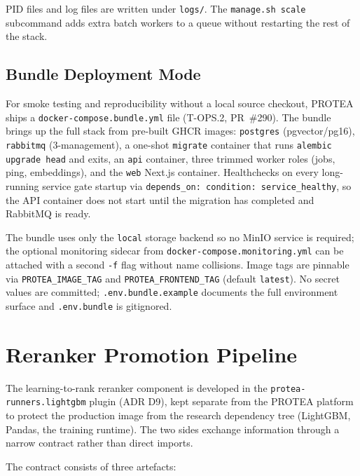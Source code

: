PID files and log files are written under \texttt{logs/}. The
\texttt{manage.sh scale} subcommand adds extra batch workers to a queue without
restarting the rest of the stack.

\subsection{Bundle Deployment Mode}
\label{subsec:bundle-deployment}

For smoke testing and reproducibility without a local source checkout, PROTEA
ships a \texttt{docker-compose.bundle.yml} file (T-OPS.2, PR~\#290). The
bundle brings up the full stack from pre-built GHCR images:
\texttt{postgres} (pgvector/pg16), \texttt{rabbitmq} (3-management), a
one-shot \texttt{migrate} container that runs \texttt{alembic upgrade head}
and exits, an \texttt{api} container, three trimmed worker roles
(jobs, ping, embeddings), and the \texttt{web} Next.js container.
Healthchecks on every long-running service gate startup via
\texttt{depends\_on: condition: service\_healthy}, so the API container does
not start until the migration has completed and RabbitMQ is ready.

The bundle uses only the \texttt{local} storage backend so no MinIO service is
required; the optional monitoring sidecar from \texttt{docker-compose.monitoring.yml}
can be attached with a second \texttt{-f} flag without name collisions.
Image tags are pinnable via \texttt{PROTEA\_IMAGE\_TAG} and
\texttt{PROTEA\_FRONTEND\_TAG} (default \texttt{latest}). No secret values are
committed; \texttt{.env.bundle.example} documents the full environment surface
and \texttt{.env.bundle} is gitignored.

\section{Reranker Promotion Pipeline}
\label{sec:reranker-promotion}

The learning-to-rank reranker component is developed in the
\texttt{protea-runners.lightgbm} plugin (ADR D9), kept separate from the
PROTEA platform to protect the production image from the research dependency
tree (LightGBM, Pandas, the training runtime). The two sides exchange
information through a narrow contract rather than direct imports.

The contract consists of three artefacts:

